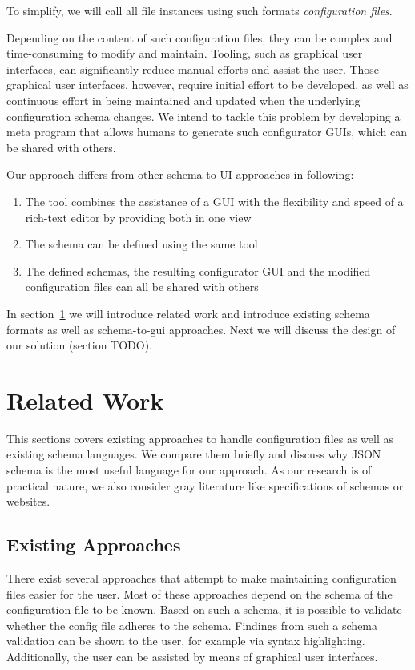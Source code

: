 \documentclass[lettersize,journal]{IEEEtran}
\newcommand{\cfgfiles}{configuration files}
\begin{document}
To simplify, we will call all file instances using such formats \textit{\cfgfiles}.

Depending on the content of such \cfgfiles, they can be complex and time-consuming to modify and maintain. 
Tooling, such as graphical user interfaces, can significantly reduce manual efforts and assist the user. 
Those graphical user interfaces, however, require initial effort to be developed, as well as continuous effort in being maintained and updated when the underlying configuration schema changes. 
We intend to tackle this problem by developing a meta program that allows humans to generate such configurator GUIs, which can be shared with others.

Our approach differs from other schema-to-UI approaches in following:

\begin{enumerate}
    \item The tool combines the assistance of a GUI with the flexibility and speed of a rich-text editor by providing both in one view
    \item The schema can be defined using the same tool
    \item The defined schemas, the resulting configurator GUI and the modified configuration files can all be shared with others
\end{enumerate}


In section~\ref{sec:research} we will introduce related work and introduce existing schema formats as well as schema-to-gui approaches.
Next we will discuss the design of our solution (section TODO).




\section{Related Work}\label{sec:research} %

This sections covers existing approaches to handle \cfgfiles{} as well as existing schema languages. We compare them briefly and discuss why JSON schema is the most useful language for our approach. As our research is of practical nature, we also consider gray literature like specifications of schemas or websites.

\subsection{Existing Approaches}
There exist several approaches that attempt to make maintaining \cfgfiles{} easier for the user. Most of these approaches depend on the schema of the configuration file to be known. Based on such a schema, it is possible to validate whether the config file adheres to the schema. Findings from such a schema validation can be shown to the user, for example via syntax highlighting. Additionally, the user can be assisted by means of graphical user interfaces.
\end{document}
